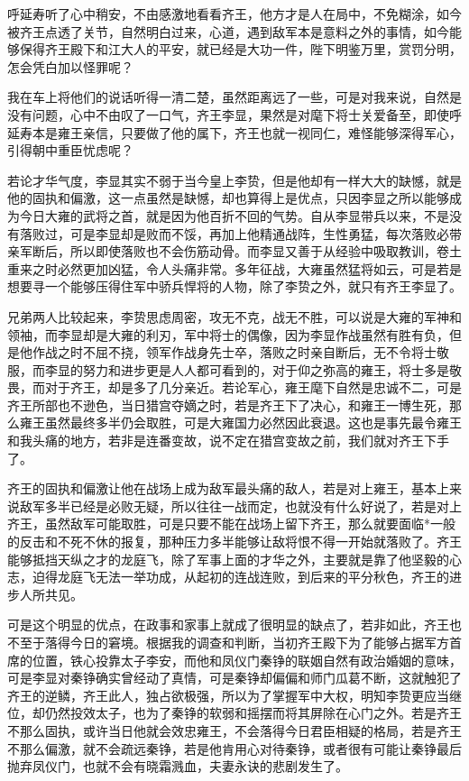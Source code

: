 呼延寿听了心中稍安，不由感激地看看齐王，他方才是人在局中，不免糊涂，如今被齐王点透了关节，自然明白过来，心道，遇到敌军本是意料之外的事情，如今能够保得齐王殿下和江大人的平安，就已经是大功一件，陛下明鉴万里，赏罚分明，怎会凭白加以怪罪呢？

我在车上将他们的说话听得一清二楚，虽然距离远了一些，可是对我来说，自然是没有问题，心中不由叹了一口气，齐王李显，果然是对麾下将士关爱备至，即使呼延寿本是雍王亲信，只要做了他的属下，齐王也就一视同仁，难怪能够深得军心，引得朝中重臣忧虑呢？

若论才华气度，李显其实不弱于当今皇上李贽，但是他却有一样大大的缺憾，就是他的固执和偏激，这一点虽然是缺憾，却也算得上是优点，只因李显之所以能够成为今日大雍的武将之首，就是因为他百折不回的气势。自从李显带兵以来，不是没有落败过，可是李显却是败而不馁，再加上他精通战阵，生性勇猛，每次落败必带亲军断后，所以即使落败也不会伤筋动骨。而李显又善于从经验中吸取教训，卷土重来之时必然更加凶猛，令人头痛非常。多年征战，大雍虽然猛将如云，可是若是想要寻一个能够压得住军中骄兵悍将的人物，除了李贽之外，就只有齐王李显了。

兄弟两人比较起来，李贽思虑周密，攻无不克，战无不胜，可以说是大雍的军神和领袖，而李显却是大雍的利刃，军中将士的偶像，因为李显作战虽然有胜有负，但是他作战之时不屈不挠，领军作战身先士卒，落败之时亲自断后，无不令将士敬服，而李显的努力和进步更是人人都可看到的，对于仰之弥高的雍王，将士多是敬畏，而对于齐王，却是多了几分亲近。若论军心，雍王麾下自然是忠诚不二，可是齐王所部也不逊色，当日猎宫夺嫡之时，若是齐王下了决心，和雍王一博生死，那么雍王虽然最终多半仍会取胜，可是大雍国力必然因此衰退。这也是事先最令雍王和我头痛的地方，若非是连番变故，说不定在猎宫变故之前，我们就对齐王下手了。

齐王的固执和偏激让他在战场上成为敌军最头痛的敌人，若是对上雍王，基本上来说敌军多半已经是必败无疑，所以往往一战而定，也就没有什么好说了，若是对上齐王，虽然敌军可能取胜，可是只要不能在战场上留下齐王，那么就要面临*一般的反击和不死不休的报复，那种压力多半能够让敌将恨不得一开始就落败了。齐王能够抵挡天纵之才的龙庭飞，除了军事上面的才华之外，主要就是靠了他坚毅的心志，迫得龙庭飞无法一举功成，从起初的连战连败，到后来的平分秋色，齐王的进步人所共见。

可是这个明显的优点，在政事和家事上就成了很明显的缺点了，若非如此，齐王也不至于落得今日的窘境。根据我的调查和判断，当初齐王殿下为了能够占据军方首席的位置，铁心投靠太子李安，而他和凤仪门秦铮的联姻自然有政治婚姻的意味，可是李显对秦铮确实曾经动了真情，可是秦铮却偏偏和师门瓜葛不断，这就触犯了齐王的逆鳞，齐王此人，独占欲极强，所以为了掌握军中大权，明知李贽更应当继位，却仍然投效太子，也为了秦铮的软弱和摇摆而将其屏除在心门之外。若是齐王不那么固执，或许当日他就会效忠雍王，不会落得今日君臣相疑的格局，若是齐王不那么偏激，就不会疏远秦铮，若是他肯用心对待秦铮，或者很有可能让秦铮最后抛弃凤仪门，也就不会有晓霜溅血，夫妻永诀的悲剧发生了。

